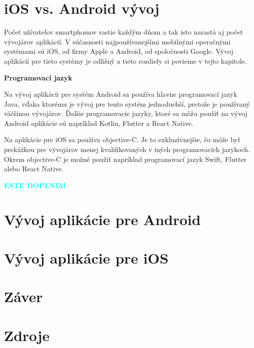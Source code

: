 \documentclass[10pt,twoside,slovak,a4paper]{article}
\begin{document}
\section{iOS vs. Android vývoj}
\quad 	Počet užívateľov smartphomov rastie každým dňom a tak isto narastá aj počet vývojárov aplikácií. V súčasnosti najpoužívanejšími mobilnými operačnými systémami sú iOS, od firmy Apple a Android, od spoločnosti Google. Vývoj aplikácií pre tieto systémy je odlišný a tieto rozdiely si povieme v tejto kapitole.

\textbf{Programovací jazyk}

Na vývoj aplikácii pre systém Android sa používa hlavne programovací jazyk Java, vďaka ktorému je vývoj pre tento systém jednoduchší, pretože je používaný väčšinou vývojárov. Ďalšie programovacie jazyky, ktoré sa môžu použiť na vývoj Android aplikácie sú napríklad Kotlin, Flutter a React Native.

Na aplikácie pre iOS sa používa objective-C. Je to exkluzívnejšie, čo môže byť prekážkou pre vývojárov menej kvalifikovaných v iných programovacích jazykoch. Okrem objective-C je možné použiť napríklad programovací jazyk Swift, Flutter alebo React Native.


\cite{eYewated2, openxcell, eYewated3, eliteml}




\vspace{1.5cm}
\textcolor{cyan}{{\textbf{\huge ESTE DOPLNIM}}}
\vspace{1.5cm}



\section{Vývoj aplikácie pre Android}




\section{Vývoj aplikácie pre iOS}


\vspace{5cm}



\section{Záver} \label{zaver} %



\section{Zdroje}


%



\end{document}
